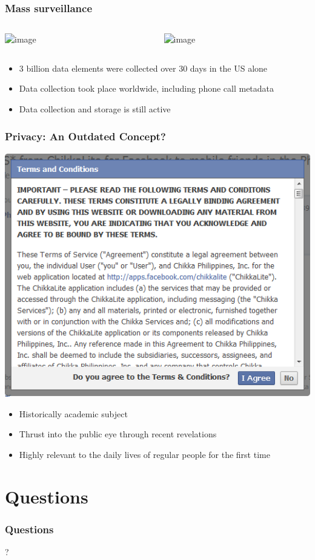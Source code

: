 \documentclass[12pt]{beamer}
\begin{document}
\begin{frame}
\frametitle{Mass surveillance}
\begin{columns}
\begin{column}{0.5\textwidth}
\begin{center}
\includegraphics<2->[scale=0.1]{snowden.jpg}
\end{center}
\end{column}
\begin{column}{0.5\textwidth}
\begin{center}
\includegraphics<2->[scale=0.2]{BoundlessInformant.PNG}
\end{center}
\end{column}
\end{columns}
\begin{itemize}
\item<3-> 3 billion data elements were collected over 30 days in the US alone
\item<3-> Data collection took place worldwide, including phone call metadata
\item<3-> Data collection and storage is still active
\end{itemize}
\end{frame}

\begin{frame}
\frametitle{Privacy: An Outdated Concept?}
\begin{center}
\includegraphics[scale=0.3]{termsandconditions.png}
\end{center}
\begin{itemize}
\item<2-> Historically academic subject
\item<2-> Thrust into the public eye through recent revelations
\item<2-> Highly relevant to the daily lives of regular people for the first time
\end{itemize}
\end{frame}

\section{Questions}

\begin{frame}
\frametitle{Questions}
\begin{center}
\Huge{?}
\end{center}
\end{frame}

 
\end{document}
